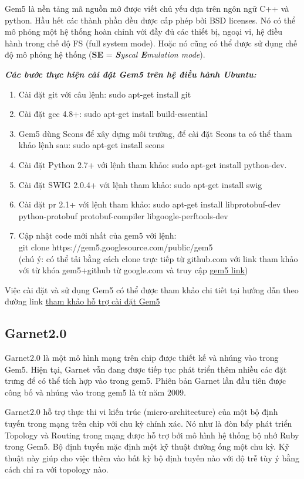 \documentclass{article}
\begin{document}
Gem5 là nền tảng mã nguồn mở được viết chủ yếu dựa trên ngôn ngữ C++ và python. Hầu hết các thành phần đều được cấp phép bởi BSD licenses. Nó có thể mô phỏng một hệ thống hoàn chỉnh với đầy đủ các thiết bị, ngoại vi, hệ điều hành trong chế độ FS (full system mode). Hoặc nó cũng có thể được sử dụng chế độ mô phỏng hệ thống (\textbf{SE} = \textit{\textbf{S}yscal \textbf{E}mulation mode}).

\textit{\textbf{Các bước thực hiện cài đặt Gem5 trên hệ điều hành Ubuntu:}}
\begin{enumerate}
	\item Cài đặt git với câu lệnh: sudo apt-get install git
	\item Cài đặt gcc 4.8+: sudo apt-get install build-essential
	\item Gem5 dùng Scons để xây dựng môi trường, để cài đặt Scons ta có thể tham khảo lệnh sau: sudo apt-get install scons
	\item Cài đặt Python 2.7+ với lệnh tham khảo: sudo apt-get install python-dev.
	\item Cài đặt SWIG 2.0.4+ với lệnh tham khảo: sudo apt-get install swig
	\item Cài đặt pr 2.1+ với lệnh tham khảo: sudo apt-get install libprotobuf-dev python-protobuf protobuf-compiler libgoogle-perftools-dev
	\item Cập nhật code mới nhất của gem5 với lệnh:\\ git clone  https://gem5.googlesource.com/public/gem5 \\(chú ý: có thể tải bằng cách clone trực tiếp từ github.com với link tham khảo với từ khóa gem5+github từ google.com và truy cập \href{ https://github.com/gem5/gem5}{gem5 link})
\end{enumerate}

Việc cài đặt và sử dụng Gem5 có thể được tham khảo chi tiết tại hướng dẫn theo đường link \href{http://learning.gem5.org/book/part1/building.html}{tham khảo hỗ trợ cài đặt Gem5}
\subsection{Garnet2.0} \label{Garnet2.0Intro}
Garnet2.0 là một mô hình mạng trên chip được thiết kế và nhúng vào trong Gem5. Hiện tại, Garnet vẫn đang được tiếp tục phát triển thêm nhiều các đặt trưng để có thể tích hợp vào trong gem5. Phiên bản Garnet lần đầu tiên được công bố và nhúng vào trong gem5 là từ năm 2009.

Garnet2.0 hỗ trợ thực thi vi kiến trúc (micro-architecture) của một bộ định tuyến trong mạng trên chip với chu kỳ chính xác. Nó như là đòn bẩy phát triển Topology và Routing trong mạng được hỗ trợ bởi mô hình hệ thống bộ nhớ Ruby trong Gem5. Bộ định tuyến mặc định một kỹ thuật đường ống một chu kỳ. Kỹ thuật này giúp cho việc thêm vào bất kỳ bộ định tuyến nào với độ trễ tùy ý bằng cách chỉ ra với topology nào. %
\end{document}
